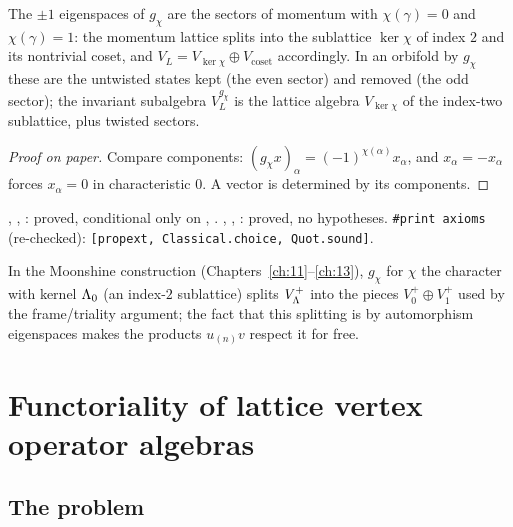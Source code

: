 \begin{physics}
The $\pm1$ eigenspaces of $g_\chi$ are the sectors of momentum with $\chi(\gamma)=0$ and $\chi(\gamma)=1$: the momentum lattice splits into the sublattice $\ker\chi$ of index $2$ and its nontrivial coset, and $V_L=V_{\ker\chi}\oplus V_{\text{coset}}$ accordingly. In an orbifold by $g_\chi$ these are the untwisted states kept (the even sector) and removed (the odd sector); the invariant subalgebra $V_L^{g_\chi}$ is the lattice algebra $V_{\ker\chi}$ of the index-two sublattice, plus twisted sectors.
\end{physics}
\begin{proof}[Proof on paper]
Compare components: $(g_\chi x)_\alpha=(-1)^{\chi(\alpha)}x_\alpha$, and $x_\alpha=-x_\alpha$
forces $x_\alpha=0$ in characteristic $0$. A vector is determined by its components.
\end{proof}
\begin{status}
, , : proved, conditional only on
, . , ,
: proved, no hypotheses. \texttt{\#print axioms} (re-checked):
\texttt{[propext, Classical.choice, Quot.sound]}.
\end{status}

In the Moonshine construction (Chapters~\ref{ch:11}--\ref{ch:13}), $g_\chi$ for $\chi$ the
character with kernel ${\Lambda}_0$ (an index-$2$ sublattice) splits $V_{\Lambda}^+$ into the pieces
$V_0^+\oplus V_1^+$ used by the frame/triality argument; the fact that this splitting is by
automorphism eigenspaces makes the products $u_{(n)}v$ respect it for free.

\section{Functoriality of lattice vertex operator algebras}\label{ch03:sec:functoriality}

\subsection{The problem}

